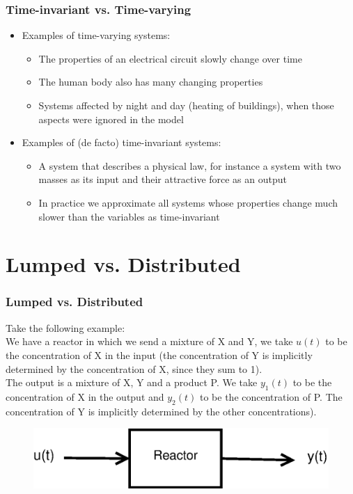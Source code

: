 \documentclass{beamer}
\begin{document}

\begin{frame}
\frametitle{Time-invariant vs. Time-varying}
\vspace{-4ex}
\begin{itemize}
\item Examples of time-varying systems:
\smallskip
\begin{itemize}
\item \normalsize{The properties of an electrical circuit slowly change over time}
\smallskip
\item \normalsize{The human body also has many changing properties}
\smallskip
\item \normalsize{Systems affected by night and day (heating of buildings), when those aspects were ignored in the model}
\end{itemize}
\medskip
\item Examples of (de facto) time-invariant systems:
\smallskip
\begin{itemize}
\item \normalsize{A system that describes a physical law, for instance a system with two masses as its input and their attractive force as an output}
\smallskip
\item \normalsize{In practice we approximate all systems whose properties change much slower than the variables as time-invariant}
\end{itemize}
\end{itemize}
\end{frame}

\section{Lumped vs. Distributed} 

\begin{frame}
\frametitle{Lumped vs. Distributed}
Take the following example:\\
\medskip
We have a reactor in which we send a mixture of X and Y, we take $u(t)$ to be the concentration of X in the input (the concentration of Y is implicitly determined by the concentration of X, since they sum to 1).\\
\medskip
The output is a mixture of X, Y and a product P. We take $y_{1}(t)$ to be the concentration of X in the output and $y_{2}(t)$ to be the concentration of P. The concentration of Y is implicitly determined by the other concentrations).\\
\begin{figure}[!htb]
\includegraphics[width=.8\linewidth]{chem.eps}
\end{figure}
\end{frame}
\end{document}
